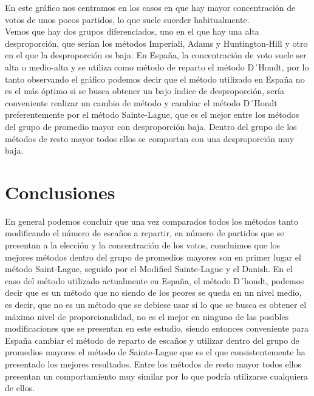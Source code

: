 \documentclass[12pt,a4paper,]{book}
\def\ifprincipal{} %
\numberwithin{dummy}{section}
\theoremstyle{ocrenumbox}
\theoremstyle{blacknumex}
\theoremstyle{blacknumbox}
\theoremstyle{ocrenum}
\theoremstyle{ocrenum}
\begin{document}
En este gráfico nos centramos en los casos en que hay mayor
concentración de votos de unos pocos partidos, lo que suele suceder
habitualmente.\\
Vemos que hay dos grupos diferenciados, uno en el que hay una alta
desproporción, que serían los métodos Imperiali, Adams y Huntington-Hill
y otro en el que la desproporción es baja. En España, la concentración
de voto suele ser alta o medio-alta y se utiliza como método de reparto
el método D´Hondt, por lo tanto observando el gráfico podemos decir que
el método utilizado en España no es el más óptimo si se busca obtener un
bajo índice de desproporción, sería conveniente realizar un cambio de
método y cambiar el método D´Hondt preferentemente por el método
Sainte-Lague, que es el mejor entre los métodos del grupo de promedio
mayor con desproporción baja. Dentro del grupo de los métodos de resto
mayor todos ellos se comportan con una desproporción muy baja.

\hypertarget{conclusiones}{%
\section{Conclusiones}\label{conclusiones}}

En general podemos concluir que una vez comparados todos los métodos
tanto modificando el número de escaños a repartir, en número de partidos
que se presentan a la elección y la concentración de los votos,
concluimos que los mejores métodos dentro del grupo de promedios mayores
son en primer lugar el método Saint-Lague, seguido por el Modified
Sainte-Lague y el Danish. En el caso del método utilizado actualmente en
España, el método D´hondt, podemos decir que es un método que no siendo
de los peores se queda en un nivel medio, es decir, que no es un método
que se debiese usar si lo que se busca es obtener el máximo nivel de
proporcionalidad, no es el mejor en ninguno de las posibles
modificaciones que se presentan en este estudio, siendo entonces
conveniente para España cambiar el método de reparto de escaños y
utilizar dentro del grupo de promedios mayores el método de Sainte-Lague
que es el que consistentemente ha presentado los mejores resultados.
Entre los métodos de resto mayor todos ellos presentan un comportamiento
muy similar por lo que podría utilizarse cualquiera de ellos.

\FloatBarrier

\ifdefined\ifprincipal
\else
\setlength{\parindent}{1em}
\pagestyle{fancy}
\setcounter{tocdepth}{4}
\tableofcontents
\end{document}
